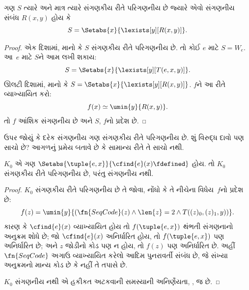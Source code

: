 \begin{thm}
ગણ $S$ ત્યારે અને માત્ર ત્યારે સંગણકીય રીતે પરિગણનીય છે
જ્યારે એવો સંગણનીય સંબંધ $R(x,y)$ હોય કે
\[
S = \Setabs{ x }{ \lexists[y][R(x,y)] }.
\]
\end{thm}

\begin{proof}
એક દિશામાં, માનો કે $S$ સંગણકીય રીતે પરિગણનીય છે.
તો કોઈ $e$ માટે $S = W_e$. આ~$e$ માટે $S$ને આમ લખી શકાય:
\[
S = \Setabs{ x }{ \lexists[y][T(e, x, y)] }.
\]
ઊલટી દિશામાં, માનો કે $S = \Setabs{ x }{
  \lexists[y][R(x, y)] }$. $f$ને આ રીતે વ્યાખ્યાયિત કરો:
\[
f(x) \simeq \umin{y}{R(x, y)}.
\]
તો $f$ આંશિક સંગણનીય છે અને $S$, $f$નો પ્રદેશ છે.
\end{proof}
\endgroup


\begingroup
\makeatletter{}\makeatother

\label{guunit:OLP-0240}



ઉપર જોયું કે દરેક સંગણનીય ગણ સંગણકીય રીતે પરિગણનીય છે. શું
વિરુદ્ધ દાવો પણ સાચો છે? આગળનું પ્રમેય બતાવે છે કે સામાન્ય રીતે
તે સાચો નથી.

\begin{thm}
$K_0$ એ ગણ $\Setabs{\tuple{e, x}}{\cfind{e}(x) \fdefined}$ હોય.
તો $K_0$ સંગણકીય રીતે પરિગણનીય છે, પરંતુ સંગણનીય નથી.
\end{thm}

\begin{proof}
$K_0$ સંગણકીય રીતે પરિગણનીય છે તે જોવા, નોંધો કે તે નીચેના
વિધેય~$f$નો પ્રદેશ છે:
\[
f(z) = \umin{y}{(\fn{SeqCode}(z) \land \len{z} = 2
  \land T((z)_0, (z)_1, y))}.
\]
કારણ કે $\cfind{e}(x)$ વ્યાખ્યાયિત હોય તો
$f(\tuple{e, x})$ થંભતી સંગણનાનો અનુક્રમ શોધે છે; જો
$\cfind{e}(x)$ અનિર્ધારિત હોય, તો $f(\tuple{e, x})$ પણ
અનિર્ધારિત છે; અને $z$ જોડીનો કોડ પણ ન હોય, તો $f(z)$ પણ
અનિર્ધારિત છે.
અહીં $\fn{SeqCode}$ અગાઉ વ્યાખ્યાયિત કરેલો આદિમ પુનરાવર્તી
સંબંધ છે, જે સંખ્યા અનુક્રમનો માન્ય કોડ છે કે નહીં તે તપાસે છે.

$K_0$ સંગણનીય નથી એ હકીકત અટકવાની સમસ્યાની અનિર્ણેયતા,
, જ છે.
\end{proof}

